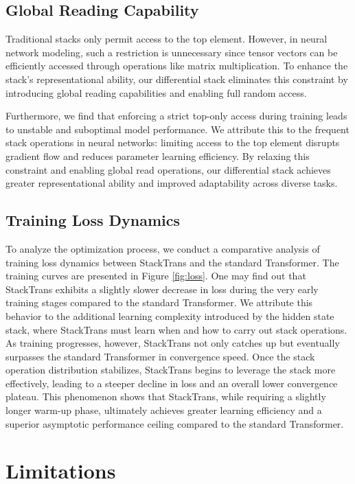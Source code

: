 \documentclass{article}
\DeclareRobustCommand{\method}{{\sc StackTrans}\xspace}
\begin{document}
\subsection{Global Reading Capability}
\label{sec:randomaccess}

Traditional stacks only permit access to the top element. However, in neural network modeling, such a restriction is unnecessary since tensor vectors can be efficiently accessed through operations like matrix multiplication. To enhance the stack’s representational ability, our differential stack eliminates this constraint by introducing global reading capabilities and enabling full random access.  

Furthermore, we find that enforcing a strict top-only access during training leads to unstable and suboptimal model performance. We attribute this to the frequent stack operations in neural networks: limiting access to the top element disrupts gradient flow and reduces parameter learning efficiency. By relaxing this constraint and enabling global read operations, our differential stack achieves greater representational ability and improved adaptability across diverse tasks.


\subsection{Training Loss Dynamics} 
\label{sec:lossanalysis}
To analyze the optimization process, we conduct a comparative analysis of training loss dynamics between \method and the standard Transformer. The training curves are presented in Figure \ref{fig:loss}.
One may find out that \method exhibits a slightly slower decrease in loss during the very early training stages compared to the standard Transformer.
We attribute this behavior to the additional learning complexity introduced by the hidden state stack, where \method must learn when and how to carry out stack operations.
As training progresses, however, \method not only catches up but eventually surpasses the standard Transformer in convergence speed.
Once the stack operation distribution stabilizes, \method begins to leverage the stack more effectively, leading to a steeper decline in loss and an overall lower convergence plateau.
This phenomenon shows that \method, while requiring a slightly longer warm-up phase, ultimately achieves greater learning efficiency and a superior asymptotic performance ceiling compared to the standard Transformer. 


\section{Limitations}
\label{sec:limitation}
\end{document}
